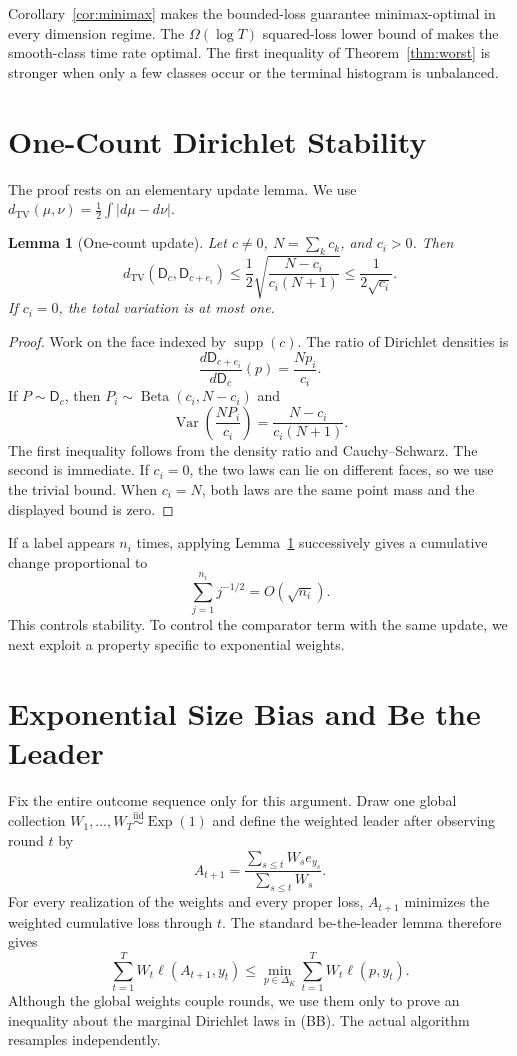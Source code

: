 \documentclass[twoside]{article}
\newtheorem{lemma}[theorem]{Lemma}
\newcommand{\D}{\mathsf D}
\newcommand{\TV}{d_{\mathrm{TV}}}
\newcommand{\supp}{\operatorname{supp}}
\begin{document}
Corollary~\ref{cor:minimax} makes the bounded-loss guarantee minimax-optimal in every dimension regime. The $\Omega(\log T)$ squared-loss lower bound of \citet{luo2024} makes the smooth-class time rate optimal. The first inequality of Theorem~\ref{thm:worst} is stronger when only a few classes occur or the terminal histogram is unbalanced.

\section{One-Count Dirichlet Stability}

The proof rests on an elementary update lemma. We use $\TV(\mu,\nu)=\tfrac12\int|d\mu-d\nu|$.

\begin{lemma}[One-count update]
\label{lem:tv}
Let $c\neq0$, $N=\sum_kc_k$, and $c_i>0$. Then \[ \TV(\D_c,\D_{c+e_i}) \leq\frac12\sqrt{\frac{N-c_i}{c_i(N+1)}} \leq\frac1{2\sqrt{c_i}}. \tag{3} \] If $c_i=0$, the total variation is at most one.
\end{lemma}

\begin{proof}
Work on the face indexed by $\supp(c)$. The ratio of Dirichlet densities is \[ \frac{d\D_{c+e_i}}{d\D_c}(p)=\frac{Np_i}{c_i}. \] If $P\sim\D_c$, then $P_i\sim\operatorname{Beta}(c_i,N-c_i)$ and \[ \operatorname{Var}\!\left(\frac{NP_i}{c_i}\right)=\frac{N-c_i}{c_i(N+1)}. \] The first inequality follows from the density ratio and Cauchy--Schwarz. The second is immediate. If $c_i=0$, the two laws can lie on different faces, so we use the trivial bound. When $c_i=N$, both laws are the same point mass and the displayed bound is zero.
\end{proof}

If a label appears $n_i$ times, applying Lemma~\ref{lem:tv} successively gives a cumulative change proportional to \[ \sum_{j=1}^{n_i}j^{-1/2}=O(\sqrt{n_i}). \] This controls stability. To control the comparator term with the same update, we next exploit a property specific to exponential weights.

\section{Exponential Size Bias and Be the Leader}

Fix the entire outcome sequence only for this argument. Draw one global collection $W_1,\ldots,W_T\stackrel{\mathrm{iid}}\sim\operatorname{Exp}(1)$ and define the weighted leader after observing round $t$ by \[ A_{t+1}=\frac{\sum_{s\leq t}W_se_{y_s}}{\sum_{s\leq t}W_s}. \tag{4} \] For every realization of the weights and every proper loss, $A_{t+1}$ minimizes the weighted cumulative loss through $t$. The standard be-the-leader lemma \citep{cesabianchi2006} therefore gives \[ \sum_{t=1}^TW_t\ell(A_{t+1},y_t) \leq\min_{p\in\Delta_K}\sum_{t=1}^TW_t\ell(p,y_t). \tag{5} \] Although the global weights couple rounds, we use them only to prove an inequality about the marginal Dirichlet laws in (BB). The actual algorithm resamples independently.
\end{document}
